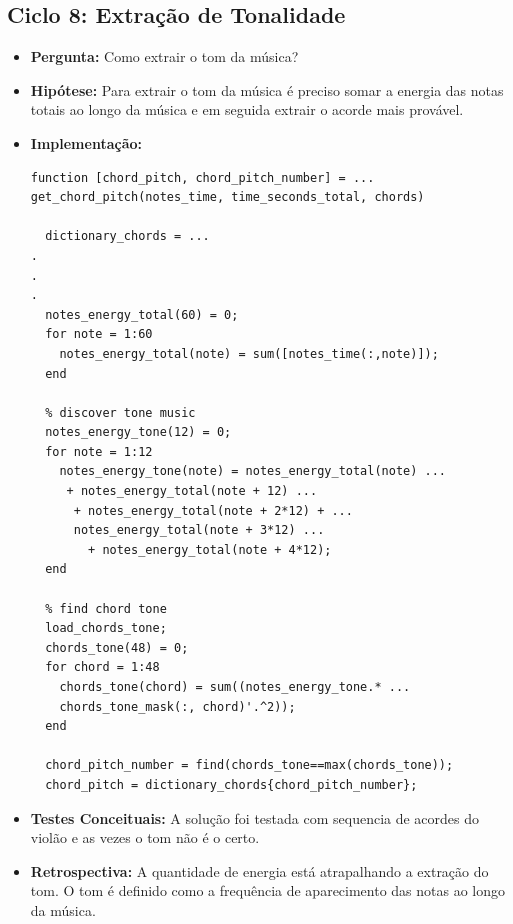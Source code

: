 \subsection{Ciclo 8: Extração de Tonalidade}
\label{subsec:ciclo_8}
\begin{itemize}
\item \textbf{Pergunta:} Como extrair o tom da música?
\item \textbf{Hipótese:} Para extrair o tom da música é preciso somar a energia das notas totais ao longo da música e em seguida extrair o acorde mais provável.
\item \textbf{Implementação:} 
\begin{lstlisting}
function [chord_pitch, chord_pitch_number] = ...
get_chord_pitch(notes_time, time_seconds_total, chords)
  
  dictionary_chords = ...
.
.
.
  notes_energy_total(60) = 0;
  for note = 1:60
    notes_energy_total(note) = sum([notes_time(:,note)]);
  end

  % discover tone music
  notes_energy_tone(12) = 0;
  for note = 1:12
    notes_energy_tone(note) = notes_energy_total(note) ...
     + notes_energy_total(note + 12) ...
      + notes_energy_total(note + 2*12) + ...
      notes_energy_total(note + 3*12) ...
        + notes_energy_total(note + 4*12);
  end

  % find chord tone
  load_chords_tone;
  chords_tone(48) = 0;
  for chord = 1:48
    chords_tone(chord) = sum((notes_energy_tone.* ...
    chords_tone_mask(:, chord)'.^2));
  end

  chord_pitch_number = find(chords_tone==max(chords_tone));
  chord_pitch = dictionary_chords{chord_pitch_number};
\end{lstlisting}
\item \textbf{Testes Conceituais:} A solução foi testada com sequencia de acordes do violão e as vezes o tom não é o certo.
\item \textbf{Retrospectiva:} A quantidade de energia está atrapalhando a extração do tom. O tom é definido como a frequência de aparecimento das notas ao longo da música.
\end{itemize}

